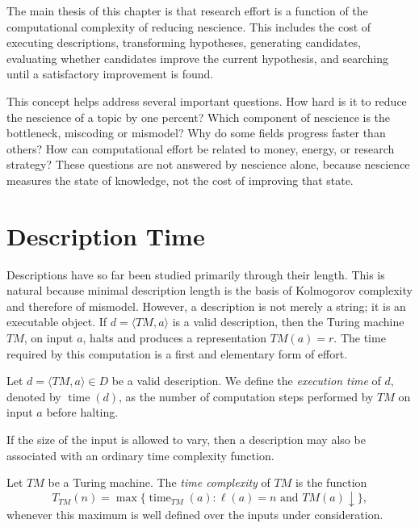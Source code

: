 The main thesis of this chapter is that research effort is a function of the computational complexity of reducing nescience. This includes the cost of executing descriptions, transforming hypotheses, generating candidates, evaluating whether candidates improve the current hypothesis, and searching until a satisfactory improvement is found.

This concept helps address several important questions. How hard is it to reduce the nescience of a topic by one percent? Which component of nescience is the bottleneck, miscoding or mismodel? Why do some fields progress faster than others? How can computational effort be related to money, energy, or research strategy? These questions are not answered by nescience alone, because nescience measures the state of knowledge, not the cost of improving that state.

\section{Description Time}
\label{sec:description_time}

Descriptions have so far been studied primarily through their length. This is natural because minimal description length is the basis of Kolmogorov complexity and therefore of mismodel. However, a description is not merely a string; it is an executable object. If $d=\langle T M,a\rangle$ is a valid description, then the Turing machine \(T M\), on input \(a\), halts and produces a representation $T M(a)=r$. The time required by this computation is a first and elementary form of effort.

\begin{definition}
Let \(d=\langle T M,a\rangle\in D\) be a valid description. We define the \emph{execution time} of \(d\), denoted by $\operatorname{time}(d)$, as the number of computation steps performed by \(T M\) on input \(a\) before halting.
\end{definition}

If the size of the input is allowed to vary, then a description may also be associated with an ordinary time complexity function.

\begin{definition}
Let \(T M\) be a Turing machine. The \emph{time complexity} of \(T M\) is the function
\[
T_{T M}(n)=\max\{\operatorname{time}_{T M}(a): \ell(a)=n \text{ and } T M(a)\downarrow\},
\]
whenever this maximum is well defined over the inputs under consideration.
\end{definition}

